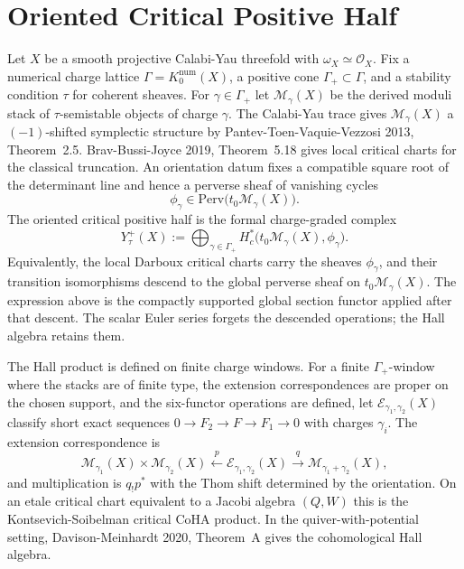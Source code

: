 \providecommand{\cY}{\mathcal{Y}}
\providecommand{\cO}{\mathcal{O}}
\providecommand{\cM}{\mathcal{M}}
\providecommand{\cE}{\mathcal{E}}
\providecommand{\CC}{\mathbb{C}}
\providecommand{\ZZ}{\mathbb{Z}}
\providecommand{\RGam}{R\Gamma}
\providecommand{\Ch}{\mathrm{Ch}}
\providecommand{\kBKM}{\kappa_{\mathrm{BKM}}}
\providecommand{\kch}{\kappa_{\mathrm{ch}}}
\providecommand{\kcat}{\kappa_{\mathrm{cat}}}
\providecommand{\kfib}{\kappa_{\mathrm{fiber}}}
\providecommand{\Yplus}{Y^{+}}
\providecommand{\DTred}{Z^{\mathrm{red}}_{\mathrm{DT}}}
\providecommand{\ZOPred}{Z^{\mathrm{red}}_{\mathrm{OP}}}
\providecommand{\PhiOP}{\Phi_{10}^{\mathrm{OP}}}

\section{Oriented Critical Positive Half}
\label{sec:global-Yplus-critical-positive-half}

Let $X$ be a smooth projective Calabi-Yau threefold with
$\omega_X\simeq\cO_X$. Fix a numerical charge lattice
$\Gamma=K_0^{\mathrm{num}}(X)$, a positive cone $\Gamma_+\subset\Gamma$,
and a stability condition $\tau$ for coherent sheaves. For
$\gamma\in\Gamma_+$ let $\cM_\gamma(X)$ be the derived moduli stack of
$\tau$-semistable objects of charge $\gamma$. The Calabi-Yau trace gives
$\cM_\gamma(X)$ a $(-1)$-shifted symplectic structure by
Pantev-Toen-Vaquie-Vezzosi 2013, Theorem~2.5. Brav-Bussi-Joyce 2019,
Theorem~5.18 gives local critical charts for the classical truncation.
An orientation datum fixes a compatible square root of the determinant
line and hence a perverse sheaf of vanishing cycles
\[
  \phi_\gamma\in\mathrm{Perv}\bigl(t_0\cM_\gamma(X)\bigr).
\]
The oriented critical positive half is the formal charge-graded complex
\[
  \Yplus_\tau(X)
  :=
  \bigoplus_{\gamma\in\Gamma_+}
  H^*_c\bigl(t_0\cM_\gamma(X),\phi_\gamma\bigr).
\]
Equivalently, the local Darboux critical charts carry the sheaves
\(\phi_\gamma\), and their transition isomorphisms descend to the
global perverse sheaf on \(t_0\cM_\gamma(X)\). The expression above is
the compactly supported global section functor applied after that
descent. The scalar Euler series forgets the descended operations; the
Hall algebra retains them.

The Hall product is defined on finite charge windows. For a finite
\(\Gamma_+\)-window where the stacks are of finite type, the extension
correspondences are proper on the chosen support, and the six-functor
operations are defined, let
$\cE_{\gamma_1,\gamma_2}(X)$ classify short exact sequences
$0\to F_2\to F\to F_1\to0$ with charges $\gamma_i$. The extension
correspondence is
\[
  \cM_{\gamma_1}(X)\times\cM_{\gamma_2}(X)
  \xleftarrow{\;p\;}
  \cE_{\gamma_1,\gamma_2}(X)
  \xrightarrow{\;q\;}
  \cM_{\gamma_1+\gamma_2}(X),
\]
and multiplication is $q_!p^*$ with the Thom shift determined by the
orientation. On an etale critical chart equivalent to a Jacobi algebra
$(Q,W)$ this is the Kontsevich-Soibelman critical CoHA product. In the
quiver-with-potential setting, Davison-Meinhardt 2020, Theorem~A gives
the cohomological Hall algebra.

